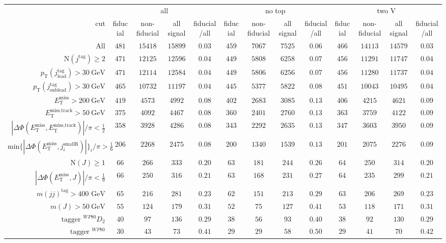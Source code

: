 \begin{tabular}{r|c|c|c|c|c|c|c|c|c|c|c|c|}
 &\multicolumn{4}{|c|}{all}&\multicolumn{4}{c|}{no top}&\multicolumn{4}{|c|}{two V}\\
cut&fiducial&non-fiducial&all signal&fiducial/all&fiducial&non-fiducial&all signal&fiducial/all&fiducial&non-fiducial&all signal&fiducial/all\\
\hline
All&$481$&$15418$&$15899$&$0.03$&$459$&$7067$&$7525$&$0.06$&$466$&$14113$&$14579$&$0.03$\\
$\text{N}(j^\text{tag})\geq2$&$471$&$12125$&$12596$&$0.04$&$449$&$5808$&$6258$&$0.07$&$456$&$11291$&$11747$&$0.04$\\
$p_\text{T}(j^\text{tag}_\text{lead})>30~\text{GeV}$&$471$&$12114$&$12584$&$0.04$&$449$&$5806$&$6256$&$0.07$&$456$&$11280$&$11737$&$0.04$\\
$p_\text{T}(j^\text{tag}_\text{sublead})>30~\text{GeV}$&$465$&$10732$&$11197$&$0.04$&$445$&$5377$&$5822$&$0.08$&$451$&$10043$&$10495$&$0.04$\\
$E_\text{T}^\text{miss} > 200~\text{GeV}$&$419$&$4573$&$4992$&$0.08$&$402$&$2683$&$3085$&$0.13$&$406$&$4215$&$4621$&$0.09$\\
$E_\text{T}^\text{miss,track} > 50~\text{GeV}$&$375$&$4092$&$4467$&$0.08$&$360$&$2401$&$2760$&$0.13$&$363$&$3759$&$4122$&$0.09$\\
$|\Delta\Phi(E_\text{T}^\text{miss},E_\text{T}^\text{miss,track})|/\pi<\frac{1}{2}$&$358$&$3928$&$4286$&$0.08$&$343$&$2292$&$2635$&$0.13$&$347$&$3603$&$3950$&$0.09$\\
$\text{min}\{|\Delta\Phi(E_\text{T}^\text{miss},j^\text{smallR}_i)|\}_i/\pi > \frac{1}{6}$&$206$&$2268$&$2475$&$0.08$&$200$&$1340$&$1539$&$0.13$&$201$&$2075$&$2276$&$0.09$\\
$\text{N}(J)\geq1$&$66$&$266$&$333$&$0.20$&$63$&$181$&$244$&$0.26$&$64$&$250$&$314$&$0.20$\\
$|\Delta\Phi(E_\text{T}^\text{miss},J)|/\pi < \frac{1}{9}$&$66$&$250$&$316$&$0.21$&$63$&$168$&$231$&$0.27$&$64$&$235$&$299$&$0.21$\\
$m(jj)^\text{tag}>400\text{ GeV}$&$65$&$216$&$281$&$0.23$&$62$&$151$&$213$&$0.29$&$63$&$206$&$269$&$0.23$\\
$m(J)>50~\text{GeV}$&$55$&$124$&$179$&$0.31$&$52$&$75$&$127$&$0.41$&$53$&$118$&$171$&$0.31$\\
$\text{tagger }^{WP80} D_{2}$&$40$&$97$&$136$&$0.29$&$38$&$56$&$93$&$0.40$&$38$&$92$&$130$&$0.29$\\
$\text{tagger }^{WP80}$&$30$&$43$&$73$&$0.41$&$29$&$29$&$58$&$0.50$&$29$&$41$&$70$&$0.42$\\
\end{tabular}
